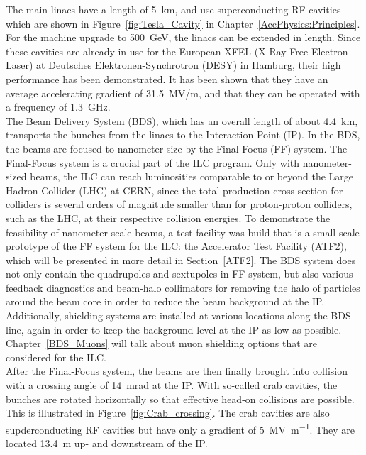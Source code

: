 The main linacs have a length of \SI{5}{\kilo\meter}, and use superconducting RF cavities which are shown in Figure~\ref{fig:Tesla_Cavity} in Chapter~\ref{AccPhysics:Principles}. 
For the machine upgrade to \SI{500}{\GeV}, the linacs can be extended in length.
Since these cavities are already in use for the European XFEL (X-Ray Free-Electron Laser) at Deutsches Elektronen-Synchrotron (DESY) in Hamburg, their high performance has been demonstrated.
It has been shown that they have an average accelerating gradient of \SI{31.5}{MV/m}, and that they can be operated with a frequency of \SI{1.3}{\giga\hertz}.~\cite{Walker}\\
The Beam Delivery System (BDS), which has an overall length of about \SI{4.4}{\kilo\meter}, transports the bunches from the linacs to the Interaction Point (IP).
In the BDS, the beams are focused to nanometer size by the Final-Focus (FF) system.
The Final-Focus system is a crucial part of the ILC program.
Only with nanometer-sized beams, the ILC can reach luminosities comparable to or beyond the Large Hadron Collider (LHC) at CERN, since the total production cross-section for \positron \electron colliders is several orders of magnitude smaller than for proton-proton colliders, such as the LHC, at their respective collision energies.
To demonstrate the feasibility of nanometer-scale beams, a test facility was build that is a small scale prototype of the FF system for the ILC: the Accelerator Test Facility (ATF2), which will be presented in more detail in Section~\ref{ATF2}.
The BDS system does not only contain the quadrupoles and sextupoles in FF system, but also various feedback diagnostics and beam-halo collimators for removing the halo of particles around the beam core in order to reduce the beam background at the IP. 
Additionally, shielding systems are installed at various locations along the BDS line, again in order to keep the background level at the IP as low as possible.
Chapter~\ref{BDS_Muons} will talk about muon shielding options that are considered for the ILC.
\\After the Final-Focus system, the beams are then finally brought into collision with a crossing angle of \SI{14}{mrad} at the IP.\cite[p. 9-10]{TDR1}
With so-called crab cavities, the bunches are rotated horizontally so that effective head-on collisions are possible.
This is illustrated in Figure~\ref{fig:Crab_crossing}.
The crab cavities are also supderconducting RF cavities but have only a gradient of \SI{5}{\mega\volt\per\meter}.
They are located \SI{13.4}{\meter} up- and downstream of the IP.~\cite[p. 154]{TDR32}
